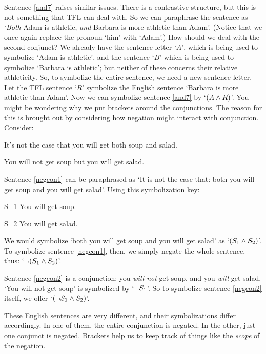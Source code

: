 Sentence \ref{and7} raises similar issues. There is a contrastive structure, but this is not something that TFL can deal with. So we can paraphrase the sentence as `\emph{Both} Adam is athletic, \emph{and} Barbara is more athletic than Adam'. (Notice that we once again replace the pronoun `him' with `Adam'.) How should we deal with the second conjunct? We already have the sentence letter `$A$', which is being used to symbolize `Adam is athletic', and the sentence `$B$' which is being used to symbolize `Barbara is athletic'; but neither of these concerns their relative athleticity. So, to symbolize the entire sentence, we need a new sentence letter. Let the TFL sentence `$R$' symbolize the English sentence `Barbara is more athletic than Adam'. Now we can symbolize sentence \ref{and7} by `$(A \wedge R)$'.
You might be wondering why we put brackets around the conjunctions. The reason for this is brought out by considering how negation might interact with conjunction. Consider:
	\begin{earg}
		\item[\ex{negcon1}] It's not the case that you will get both soup and salad.
		\item[\ex{negcon2}] You will not get soup but you will get salad.
	\end{earg}
Sentence \ref{negcon1} can be paraphrased as `It is not the case that: both you will get soup and you will get salad'. Using this symbolization key:
	\begin{ekey}
		\item[S_1] You will get soup.
		\item[S_2] You will get salad.
	\end{ekey}
We would symbolize `both you will get soup and you will get salad' as `$(S_1 \wedge S_2)$'. To symbolize sentence \ref{negcon1}, then, we simply negate the whole sentence, thus: `$\neg (S_1 \wedge S_2)$'. 

Sentence \ref{negcon2} is a conjunction: you \emph{will not} get soup, and you \emph{will} get salad. `You will not get soup' is symbolized by `$\neg S_1$'. So to symbolize sentence \ref{negcon2} itself, we offer `$(\neg S_1 \wedge S_2)$'. 

These English sentences are very different, and their symbolizations differ accordingly. In one of them, the entire conjunction is negated. In the other, just one conjunct is negated. Brackets help us to keep track of things like the \emph{scope} of the negation. 

